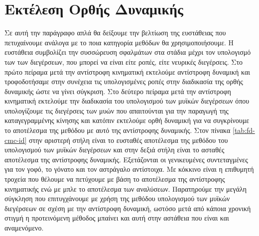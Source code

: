 \section{Εκτέλεση Ορθής Δυναμικής}

Σε αυτή την παράγραφο απλά θα δείξουμε την βελτίωση της ευστάθειας που πετυχαίνουμε ανάλογα με το ποια κατηγορία μεθόδων θα χρησιμοποιήσουμε. Η ευστάθεια συμβολίζει την συσσώρευση σφαλμάτων στα στάδια μέχρι τον υπολογισμό των των διεγέρσεων, που μπορεί να είναι είτε ροπές, είτε νευρικές διεγέρσεις. Στο πρώτο πείραμα μετά την αντίστροφη κινηματική εκτελούμε αντίστροφη δυναμική και τροφοδοτήσαμε στην συνέχεια τις υπολογισμένες ροπές στην διαδικασία της ορθής δυναμικής ώστε να γίνει σύγκριση. Στο δεύτερο πείραμα μετά την αντίστροφη κινηματική εκτελούμε την διαδικασία του υπολογισμού των μυϊκών διεγέρσεων όπου υπολογίζουμε τις διεγέρσεις των μυών που απαιτούνται για την παραγωγή της καταγεγραμμένης κίνησης και κατόπιν εκτελούμε ορθή δυναμική για να συγκρίνουμε το αποτέλεσμα της μεθόδου με αυτό της αντίστροφης δυναμικής. Στον πίνακα \ref{tab:fd-cmc-id} στην αριστερή στήλη είναι το ευσταθές αποτέλεσμα της μεθόδου του υπολογισμού των μυϊκών διεγέρσεων και στην δεξιά στήλη είναι το ασταθές αποτέλεσμα της αντίστροφης δυναμικής. Εξετάζονται οι γενικευμένες συντεταγμένες για τον γοφό, το γόνατο και τον αστράγαλο αντίστοιχα. Με κόκκινο είναι η επιθυμητή τροχεία που θέλουμε να πετύχουμε με βάση το αποτέλεσμα της αντίστροφης κινηματικής ενώ με μπλε το αποτέλεσμα των αναλύσεων. Παρατηρούμε την μεγάλη σύγκληση που επιτυγχάνουμε με χρήση της μεθόδου υπολογισμού των μυϊκών διεγέρσεων σε σχέση με την αντίστροφη δυναμική, ωστόσο μετά από κάποια χρονική στιγμή η προτεινόμενη μέθοδος μπαίνει και αυτή στην αστάθεια που είναι και αναμενόμενο.

